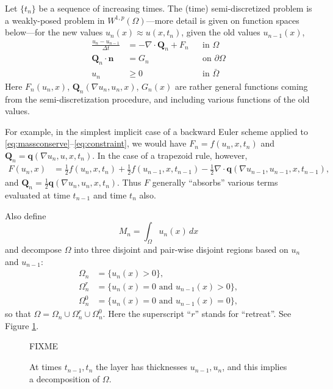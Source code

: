 \documentclass[final,leqno,onefignum,onetabnum]{siamltex1213bueler}
\newcommand\bn{\mathbf{n}}
\newcommand\bq{\mathbf{q}}
\newcommand\bQ{\mathbf{Q}}
\newcommand{\Div}{\nabla\cdot}
\renewcommand{\grad}{\nabla}
\begin{document}
Let $\{t_n\}$ be a sequence of increasing times.  The (time) semi-discretized problem is a weakly-posed problem in $W^{1,p}(\Omega)$---more detail is given on function spaces below---for the new values $u_n(x) \approx u(x,t_n)$, given the old values $u_{n-1}(x)$,
\begin{align}
\frac{u_n - u_{n-1}}{\Delta t} &= - \Div \bQ_n + F_n &&\text{in } \Omega \label{eq:semimassconserve} \\
\bQ_n \cdot \bn &= G_n &&\text{on } \partial\Omega \label{eq:semifixedneumann} \\
u_n &\ge 0 &&\text{in } \bar\Omega \label{eq:semiconstraint}
\end{align}
Here $F_n(u_n,x)$, $\bQ_n(\grad u_n,u_n,x)$, $G_n(x)$ are rather general functions coming from the semi-discretization procedure, and including various functions of the old values.

For example, in the simplest implicit case of a backward Euler scheme applied to \eqref{eq:massconserve}--\eqref{eq:constraint}, we would have $F_n = f(u_n,x,t_n)$ and $\bQ_n = \bq(\grad u_n,u,x,t_n)$.  In the case of a trapezoid rule, however,
\begin{align*}
F(u_n,x) &= \frac{1}{2} f(u_n,x,t_n) + \frac{1}{2} f(u_{n-1},x,t_{n-1}) - \frac{1}{2} \Div \bq(\grad u_{n-1},u_{n-1},x,t_{n-1}),
\end{align*}
and $\bQ_n = \frac{1}{2} \bq(\grad u_n,u_n,x,t_n)$.  Thus $F$ generally ``absorbs'' various terms evaluated at time $t_{n-1}$ and time $t_n$ also.

Also define
\begin{equation}
M_n = \int_\Omega u_n(x)\,dx
\end{equation}
and decompose $\Omega$ into three disjoint and pair-wise disjoint regions based on $u_n$ and $u_{n-1}$:
\begin{align*}
\Omega_n &= \{u_n(x)>0\}, \\
\Omega_n^r &= \{u_n(x)=0 \text{ and } u_{n-1}(x) > 0\}, \\
\Omega_n^0 &= \{u_n(x)=0 \text{ and } u_{n-1}(x) = 0\},
\end{align*}
so that $\Omega = \Omega_n \cup \Omega_n^r \cup \Omega_n^0$.  Here the superscript ``$r$'' stands for ``retreat''.  See Figure \ref{fig:domains}.

\begin{figure}[ht]
\centerline{FIXME}
\caption{At times $t_{n-1},t_n$ the layer has thicknesses $u_{n-1},u_n$, and this implies a decomposition of $\Omega$.}
\label{fig:domains}
\end{figure}
\end{document}
